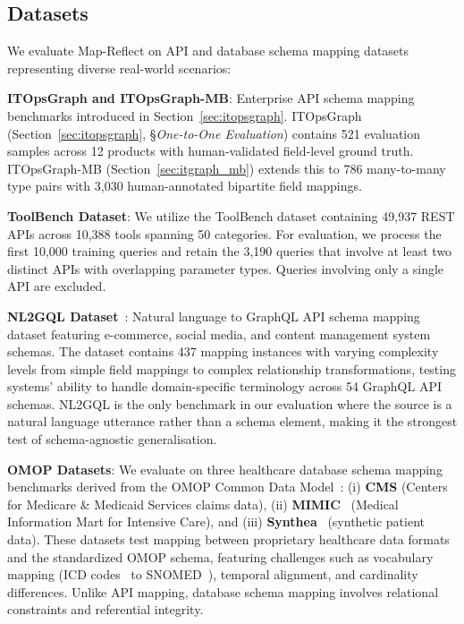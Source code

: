 \documentclass[sigconf, nonacm]{acmart}
\begin{document}
\subsection{Datasets}

We evaluate Map-Reflect on API and database schema mapping datasets representing diverse real-world scenarios:

\textbf{ITOpsGraph and ITOpsGraph-MB}: Enterprise API schema mapping benchmarks introduced in Section~\ref{sec:itopsgraph}. ITOpsGraph (Section~\ref{sec:itopsgraph}, §\emph{One-to-One Evaluation}) contains 521 evaluation samples across 12 products with human-validated field-level ground truth. ITOpsGraph-MB (Section~\ref{sec:itgraph_mb}) extends this to 786 many-to-many type pairs with 3,030 human-annotated bipartite field mappings.

\textbf{ToolBench Dataset}: We utilize the ToolBench dataset containing 49,937 REST APIs across 10,388 tools spanning 50 categories. For evaluation, we process the first 10,000 training queries and retain the 3,190 queries that involve at least two distinct APIs with overlapping parameter types. Queries involving only a single API are excluded.

\textbf{NL2GQL Dataset}~\cite{kesarwani-etal-2024-graphql}: Natural language to GraphQL API schema mapping dataset featuring e-commerce, social media, and content management system schemas. The dataset contains 437 mapping instances with varying complexity levels from simple field mappings to complex relationship transformations, testing systems' ability to handle domain-specific terminology across 54 GraphQL API schemas. NL2GQL is the only benchmark in our evaluation where the source is a natural language utterance rather than a schema element, making it the strongest test of schema-agnostic generalisation.

\textbf{OMOP Datasets}: We evaluate on three healthcare database schema mapping benchmarks derived from the OMOP Common Data Model~\cite{omop,garza2016omop,hripcsak2015ohdsi}: (i) \textbf{CMS} (Centers for Medicare \& Medicaid Services claims data), (ii) \textbf{MIMIC}~\cite{johnson2016mimic} (Medical Information Mart for Intensive Care), and (iii) \textbf{Synthea}~\cite{walonoski2018synthea} (synthetic patient data). These datasets test mapping between proprietary healthcare data formats and the standardized OMOP schema, featuring challenges such as vocabulary mapping (ICD codes~\cite{who2019icd10} to SNOMED~\cite{snomed2021}), temporal alignment, and cardinality differences. Unlike API mapping, database schema mapping involves relational constraints and referential integrity.
\end{document}
